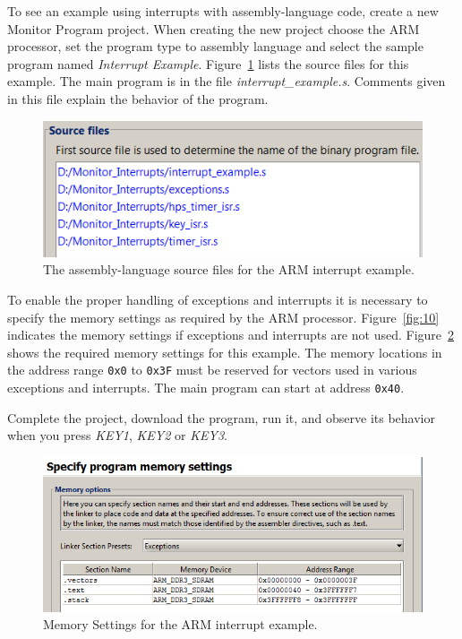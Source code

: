 \documentclass[11pt, twoside, pdftex]{article}
\begin{document}
To see an example using interrupts with assembly-language code, 
create a new Monitor Program project.
When creating the new project choose the ARM processor,
set the program type to assembly language and select the sample
program named {\it Interrupt Example}. 
Figure~\ref{fig:30} lists the source files for this example.
The main program is in the file {\it interrupt\_example.s}.
Comments given in this file explain the behavior of the program.
~\\
 
\begin{figure}[h]
   \begin{center}
      \includegraphics[scale=1]{screenshots/figure30.png}
   \end{center}
   \caption{The assembly-language source files for the ARM interrupt example.}
	 \label{fig:30}
\end{figure}

To enable the proper handling of exceptions and 
interrupts it is necessary to specify the memory settings as
required by the ARM processor. Figure~\ref{fig:10} indicates the memory 
settings if exceptions and interrupts are not used.
Figure~\ref{fig:31} shows the required memory settings for this example.
The memory locations in the address range \texttt{0x0}
to \texttt{0x3F} must be reserved for vectors used in various
exceptions and interrupts. The main program can start at
address \texttt{0x40}.

Complete the project, download the program, run it, and observe
its behavior when you press {\it KEY1}, {\it KEY2} or {\it KEY3}.   
~\\

\begin{figure}[H]
   \begin{center}
      \includegraphics[scale=0.9]{screenshots/figure31.png}
   \end{center}
   \caption{Memory Settings for the ARM interrupt example.}
	 \label{fig:31}
\end{figure}
\end{document}

